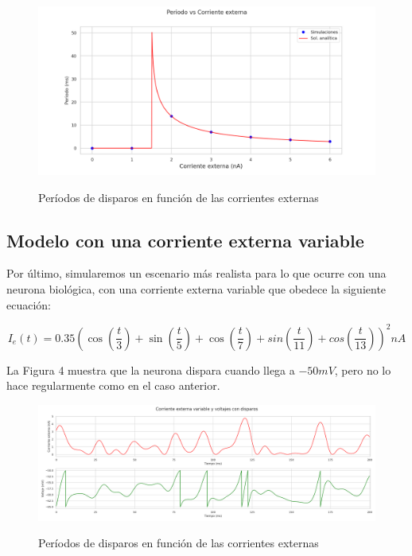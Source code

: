 \documentclass[12pt,letterpaper]{article}
\begin{document}
\begin{figure}[h!]
\begin{floatrow}
\centering
\caption{Períodos de disparos en función de las corrientes externas}
\includegraphics[width=15cm]{../images/periodo_corriente.png}
\label{fig:esquema}
\end{floatrow}
\end{figure}

\subsection{Modelo con una corriente externa variable}

Por último, simularemos un escenario más realista para lo que ocurre con una neurona biológica, con una corriente externa variable que obedece la siguiente ecuación:

$$I_e(t) = 0.35\left(\cos\left({\frac{t}{3}}\right) + \sin\left(\frac{t}{5}\right) + \cos\left(\frac{t}{7}\right) +  
sin\left(\frac{t}{11}\right)+ cos\left(\frac{t}{13}\right)\right)^2
nA$$

La Figura 4 muestra que la neurona dispara cuando llega a $-50mV$, pero no lo hace regularmente como en el caso anterior.

\begin{figure}[h!]
\begin{floatrow}
\centering
\caption{Períodos de disparos en función de las corrientes externas}
\includegraphics[width=18cm]{../images/no_cte_disparos.png}
\label{fig:esquema}
\end{floatrow}
\end{figure}
\end{document}
